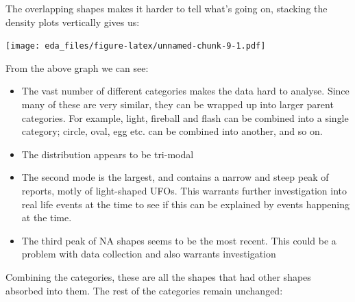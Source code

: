 \documentclass[
]{article}
\providecommand{\tightlist}{%
  \setlength{\itemsep}{0pt}\setlength{\parskip}{0pt}}
\begin{document}
The overlapping shapes makes it harder to tell what's going on, stacking
the density plots vertically gives us:

\texttt{[image: eda\_files/figure-latex/unnamed-chunk-9-1.pdf]}

From the above graph we can see:

\begin{itemize}
\tightlist
\item
  The vast number of different categories makes the data hard to
  analyse. Since many of these are very similar, they can be wrapped up
  into larger parent categories. For example, light, fireball and flash
  can be combined into a single category; circle, oval, egg etc. can be
  combined into another, and so on.
\end{itemize}

\begin{itemize}
\item
  The distribution appears to be tri-modal
\item
  The second mode is the largest, and contains a narrow and steep peak
  of reports, motly of light-shaped UFOs. This warrants further
  investigation into real life events at the time to see if this can be
  explained by events happening at the time.
\item
  The third peak of NA shapes seems to be the most recent. This could be
  a problem with data collection and also warrants investigation
\end{itemize}

Combining the categories, these are all the shapes that had other shapes
absorbed into them. The rest of the categories remain unchanged:
\end{document}
